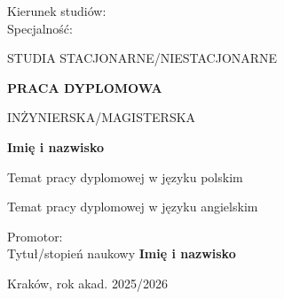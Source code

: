 \begin{titlepage}
\begin{flushleft}
\fontsize{14pt}{16pt}\selectfont
Kierunek studiów: \\
Specjalność: 
\end{flushleft}

\vspace{1cm}

\begin{center}
\fontsize{14pt}{16pt}\selectfont
STUDIA STACJONARNE/NIESTACJONARNE
\end{center}

\vspace{0.5cm}
\begin{center}
\fontsize{24pt}{26pt}\selectfont
\textbf{PRACA DYPLOMOWA} \\
\end{center}
\begin{center}
\fontsize{12pt}{14pt}\selectfont
INŻYNIERSKA/MAGISTERSKA
\end{center}
\vspace{0.5cm}
\begin{center}
\fontsize{14pt}{16pt}\selectfont
\textbf{Imię i nazwisko}
\end{center}
\vspace{0.5cm}
\begin{center}
\fontsize{14pt}{16pt}\selectfont

Temat pracy dyplomowej w języku polskim \\
\vspace{0.3cm}

Temat pracy dyplomowej w języku angielskim

\end{center}

\vspace{2cm}


\begin{center}
\large Promotor: \\ Tytuł/stopień naukowy \textbf{Imię i nazwisko}
\end{center}

\vspace{1cm}

\begin{center}
\Large Kraków, rok akad. 2025/2026
\end{center}
\end{titlepage}

\shipout\null

